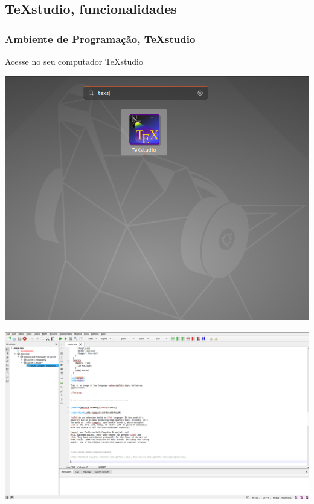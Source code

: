 \documentclass{beamer}
\begin{document}
\begin{frame}

  \section{TeXstudio, funcionalidades}
  \frametitle{Ambiente de Programação, TeXstudio}
  Acesse no seu computador TeXstudio
  \begin{center}
  \includegraphics[scale=0.10]{../Imagens/Am1.png}
  \end{center}

  \pause

  \begin{center}
  \includegraphics[scale=0.15]{../Imagens/Am2.png}
\end{center}


\end{frame}
\end{document}
